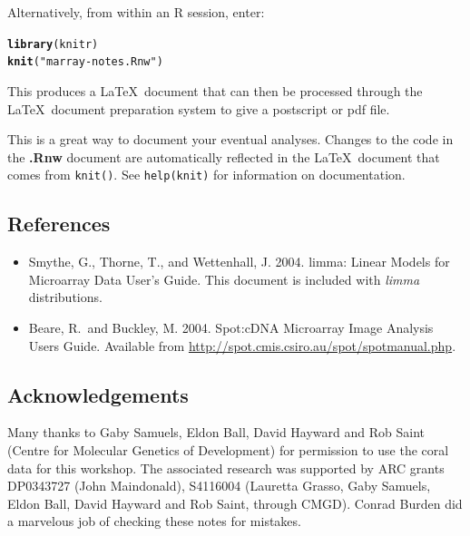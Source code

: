 \documentclass[a4paper,9pt]{article}\usepackage[]{graphicx}\usepackage[]{xcolor}
\makeatletter
\newcommand{\hlstr}[1]{\textcolor[rgb]{0.192,0.494,0.8}{#1}}%
\newcommand{\hlstd}[1]{\textcolor[rgb]{0.345,0.345,0.345}{#1}}%
\newcommand{\hlkwd}[1]{\textcolor[rgb]{0.737,0.353,0.396}{\textbf{#1}}}%
\newenvironment{kframe}{%
 \def\at@end@of@kframe{}%
 \ifinner\ifhmode%
  \def\at@end@of@kframe{\end{minipage}}%
  \begin{minipage}{\columnwidth}%
 \fi\fi%
 \def\FrameCommand##1{\hskip\@totalleftmargin \hskip-\fboxsep
 \colorbox{shadecolor}{##1}\hskip-\fboxsep
     \hskip-\linewidth \hskip-\@totalleftmargin \hskip\columnwidth}%
 \MakeFramed {\advance\hsize-\width
   \@totalleftmargin\z@ \linewidth\hsize
   \@setminipage}}%
 {\par\unskip\endMakeFramed%
 \at@end@of@kframe}
\newenvironment{knitrout}{}{} %
\makeatother
\begin{document}
Alternatively, from within an R session, enter:
\begin{knitrout}
\color{fgcolor}\begin{kframe}
\begin{alltt}
\hlkwd{library}\hlstd{(knitr)}
\hlkwd{knit}\hlstd{(}\hlstr{"marray-notes.Rnw"}\hlstd{)}
\end{alltt}
\end{kframe}
\end{knitrout}
This produces a \LaTeX\ document that can then be processed through the
\LaTeX\ document preparation system to give a postscript or pdf file.

This is a great way to document your eventual analyses.  Changes to
the code in the \textbf{.Rnw} document are automatically reflected
in the \LaTeX\ document that comes from \texttt{knit()}.
See \texttt{help(knit)} for information on documentation.

\subsection*{References}
\begin{itemize}
\item[] Smythe, G., Thorne, T., and Wettenhall, J. 2004. limma: Linear
Models for Microarray Data User's Guide.  This document is included
with \textit{limma} distributions.
\item[] Beare, R.\ and Buckley, M. 2004. Spot:cDNA Microarray Image
Analysis Users Guide.
Available from \url{http://spot.cmis.csiro.au/spot/spotmanual.php}.
\end{itemize}

\subsection*{Acknowledgements}
Many thanks to Gaby Samuels, Eldon Ball, David Hayward and Rob Saint
(Centre for Molecular Genetics of Development) for permission to use
the coral data for this workshop.  The associated research was
supported by ARC grants DP0343727 (John Maindonald), S4116004
(Lauretta Grasso, Gaby Samuels, Eldon Ball, David Hayward and Rob
Saint, through CMGD).  Conrad Burden did a marvelous job of checking
these notes for mistakes.
\end{document}
